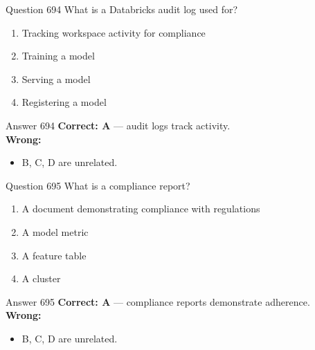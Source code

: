 \documentclass[aspectratio=169,11pt]{beamer}
\begin{document}
	\begin{frame}{Question 694}
		What is a Databricks audit log used for?
		\begin{enumerate}[label=\Alph*.]
			\item Tracking workspace activity for compliance
			\item Training a model
			\item Serving a model
			\item Registering a model
		\end{enumerate}
	\end{frame}
	\begin{frame}{Answer 694}
		\textbf{Correct: A} --- audit logs track activity.\\
		\vspace{0.5em}
		\textbf{Wrong:}
		\begin{itemize}
			\item B, C, D are unrelated.
		\end{itemize}
	\end{frame}
	
	\begin{frame}{Question 695}
		What is a compliance report?
		\begin{enumerate}[label=\Alph*.]
			\item A document demonstrating compliance with regulations
			\item A model metric
			\item A feature table
			\item A cluster
		\end{enumerate}
	\end{frame}
	\begin{frame}{Answer 695}
		\textbf{Correct: A} --- compliance reports demonstrate adherence.\\
		\vspace{0.5em}
		\textbf{Wrong:}
		\begin{itemize}
			\item B, C, D are unrelated.
		\end{itemize}
	\end{frame}
	
\end{document}
